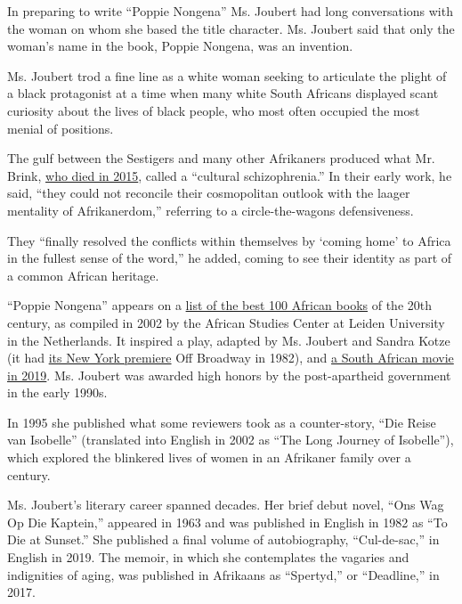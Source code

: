 In preparing to write ``Poppie Nongena'' Ms. Joubert had long
conversations with the woman on whom she based the title character. Ms.
Joubert said that only the woman's name in the book, Poppie Nongena, was
an invention.

Ms. Joubert trod a fine line as a white woman seeking to articulate the
plight of a black protagonist at a time when many white South Africans
displayed scant curiosity about the lives of black people, who most
often occupied the most menial of positions.

The gulf between the Sestigers and many other Afrikaners produced what
Mr. Brink,
\href{https://www.nytimes3xbfgragh.onion/2015/02/08/books/andre-brink-south-african-literary-figure-who-ran-afoul-of-censors-dies-at-79.html}{who
died in 2015}, called a ``cultural schizophrenia.'' In their early work,
he said, ``they could not reconcile their cosmopolitan outlook with the
laager mentality of Afrikanerdom,'' referring to a circle-the-wagons
defensiveness.

They ``finally resolved the conflicts within themselves by `coming home'
to Africa in the fullest sense of the word,'' he added, coming to see
their identity as part of a common African heritage.

``Poppie Nongena'' appears on a
\href{https://www.ascleiden.nl/content/webdossiers/africas-100-best-books-20th-century}{list
of the best 100 African books} of the 20th century, as compiled in 2002
by the African Studies Center at Leiden University in the Netherlands.
It inspired a play, adapted by Ms. Joubert and Sandra Kotze (it had
\href{https://www.nytimes3xbfgragh.onion/1982/03/28/theater/theater-the-long-journey-of-poppie-nongena.html}{its
New York premiere} Off Broadway in 1982), and
\href{https://www.imdb.com/title/tt9248912/?ref_=ttfc_fc_tt}{a South
African movie in 2019}. Ms. Joubert was awarded high honors by the
post-apartheid government in the early 1990s.

In 1995 she published what some reviewers took as a counter-story, ``Die
Reise van Isobelle'' (translated into English in 2002 as ``The Long
Journey of Isobelle''), which explored the blinkered lives of women in
an Afrikaner family over a century.

Ms. Joubert's literary career spanned decades. Her brief debut novel,
``Ons Wag Op Die Kaptein,'' appeared in 1963 and was published in
English in 1982 as ``To Die at Sunset.'' She published a final volume of
autobiography, ``Cul-de-sac,'' in English in 2019. The memoir, in which
she contemplates the vagaries and indignities of aging, was published in
Afrikaans as ``Spertyd,'' or ``Deadline,'' in 2017.

